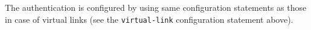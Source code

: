 \begin{description}
\begin{description}
\begin{description}
\begin{description}
\begin{description}
\begin{description}
The authentication is configured by using same configuration statements
as those in case of virtual links (see the {\tt virtual-link}
configuration statement above).






\end{description}
\end{description}
\end{description}
\end{description}
\end{description}
\end{description}
